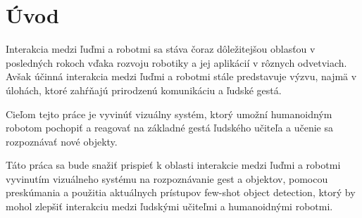 \chapter{Úvod}\label{chap:intro}
Interakcia medzi ľuďmi a robotmi sa stáva čoraz dôležitejšou oblasťou v posledných rokoch vďaka rozvoju robotiky a jej aplikácií v rôznych odvetviach. Avšak účinná interakcia medzi ľuďmi a robotmi stále predstavuje výzvu, najmä v úlohách, ktoré zahŕňajú prirodzenú komunikáciu a ľudské gestá.

Cieľom tejto práce je vyvinúť vizuálny systém, ktorý umožní humanoidným robotom pochopiť a reagovať na základné gestá ľudského učiteľa a učenie sa rozpoznávať nové objekty. 

Táto práca sa bude snažiť prispieť k oblasti interakcie medzi ľuďmi a robotmi vyvinutím vizuálneho systému na rozpoznávanie gest a objektov, pomocou preskúmania a použitia aktuálnych prístupov few-shot object detection, ktorý by mohol zlepšiť interakciu medzi ľudskými učiteľmi a humanoidnými robotmi.